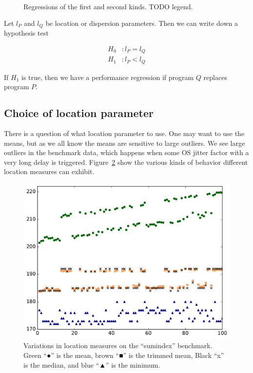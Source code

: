 \documentclass[conference]{IEEEtran}
\begin{document}
\begin{figure}
\centering

\caption{Regressions of the first and second kinds. TODO legend.}
\label{fig:regressionkinds}
\end{figure}

Let $l_P$ and $l_Q$ be location or dispersion parameters. Then we can write down a hypothesis test

\begin{subequations}
\begin{align}
H_0&: l_P = l_Q \\
H_1&: l_P < l_Q
\end{align}
\end{subequations}

If $H_1$ is true, then we have a performance regression if program $Q$ replaces program $P$.


\subsection{Choice of location parameter}

There is a question of what location parameter to use.
One may want to use the means, but as we all know the means are sensitive to large outliers. We see large outliers in the benchmark data, which happens when some OS jitter factor with a very long delay is triggered.
Figure~\ref{fig:locationmeasures} show the various kinds of behavior different location measures can exhibit.

\begin{figure}
\centering
\includegraphics[width=\textwidth]{figures/fig3/location_estimators_sumindex}
\caption{Variations in location measures on the ``sumindex'' benchmark. Green ``●'' is the mean, brown ``■'' is the trimmed mean, Black ``x'' is the median, and blue ``▲'' is the minimum.}
\label{fig:locationmeasures}
\end{figure}
\end{document}
